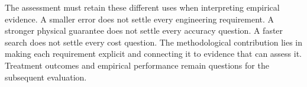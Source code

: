 The assessment must retain these different uses when interpreting empirical evidence. A smaller error does not settle every engineering requirement. A stronger physical guarantee does not settle every accuracy question. A faster search does not settle every cost question. The methodological contribution lies in making each requirement explicit and connecting it to evidence that can assess it. Treatment outcomes and empirical performance remain questions for the subsequent evaluation.

